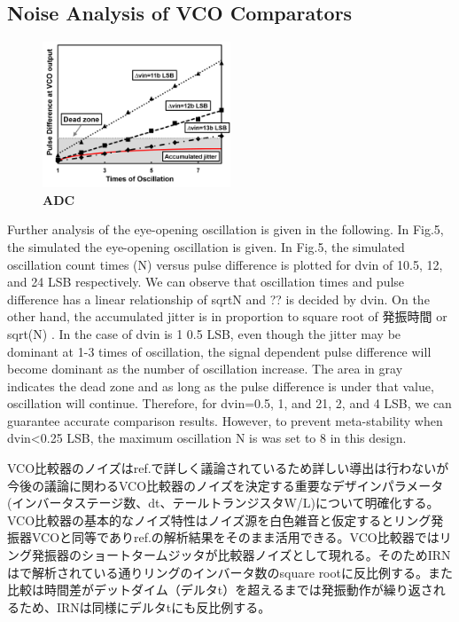 \documentclass[letterpaper, 10 pt, conference]{ieeeconf}  %
\begin{document}
\subsection{Noise Analysis of VCO Comparators}
\begin{figure}[ht!]
\centering
 \includegraphics[width=0.5\textwidth]{figs/fig5.png}
  \captionsetup{font=footnotesize}
  \caption{\textbf{ADC}}
  \label{highlight}
\end{figure}
Further analysis of the eye-opening oscillation is given in the following. In Fig.5, the simulated the eye-opening oscillation is given. In Fig.5, the simulated oscillation count times (N) versus pulse difference is plotted for dvin of 10.5, 12, and 24 LSB respectively. We can observe that oscillation times and pulse difference has a linear relationship of sqrtN and ?? is decided by dvin. On the other hand, the accumulated jitter is in proportion to square root of 発振時間 or sqrt(N) \cite{hajimiri1999jitter,abidi2006phase}. In the case of dvin is 1 0.5 LSB, even though the jitter may be dominant at 1-3 times of oscillation, the signal dependent pulse difference will become dominant as the number of oscillation increase. The area in gray indicates the dead zone and as long as the pulse difference is under that value, oscillation will continue. Therefore, for dvin=0.5, 1, and 21, 2, and 4 LSB, we can guarantee accurate comparison results. However, to prevent meta-stability when dvin<0.25 LSB, the maximum oscillation N is was set to 8 in this design.

VCO比較器のノイズはref.\cite{luo2020input}で詳しく議論されているため詳しい導出は行わないが今後の議論に関わるVCO比較器のノイズを決定する重要なデザインパラメータ(インバータステージ数、dt、テールトランジスタW/L)について明確化する。VCO比較器の基本的なノイズ特性はノイズ源を白色雑音と仮定するとリング発振器VCOと同等でありref.\cite{hajimiri1999jitter}の解析結果をそのまま活用できる。VCO比較器ではリング発振器のショートタームジッタが比較器ノイズとして現れる。そのためIRNは\cite{hajimiri1999jitter}で解析されている通りリングのインバータ数のsquare rootに反比例する。また比較は時間差がデットダイム（デルタt）を超えるまでは発振動作が繰り返されるため、IRNは同様にデルタtにも反比例する。
\end{document}

